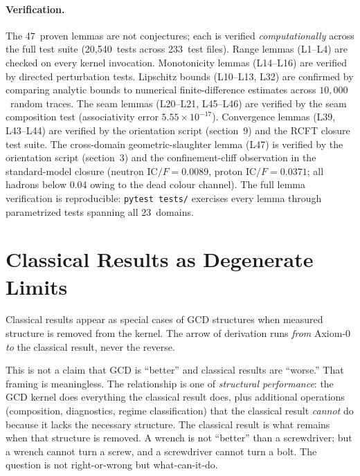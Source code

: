 \documentclass[
  aps,
  prd,
  twocolumn,
  superscriptaddress,
  nofootinbib,
  floatfix
]{revtex4-2}
\newcommand{\IC}{\mathrm{IC}}
\begin{document}
\paragraph{Verification.}
The 47~proven lemmas are not conjectures; each is verified
\emph{computationally} across the full test suite
(20{,}540~tests across 233~test files).  Range lemmas (L1--L4)
are checked on every kernel invocation.  Monotonicity lemmas
(L14--L16) are verified by directed perturbation tests.
Lipschitz bounds (L10--L13, L32) are confirmed by comparing
analytic bounds to numerical finite-difference estimates
across $10{,}000$~random traces.  The seam lemmas
(L20--L21, L45--L46) are verified by the seam composition
test (associativity error $5.55 \times 10^{-17}$).
Convergence lemmas (L39, L43--L44) are verified by the
orientation script (section~9) and the RCFT closure test
suite.  The cross-domain geometric-slaughter lemma (L47)
is verified by the orientation script (section~3) and the
confinement-cliff observation in the standard-model closure
(neutron $\IC/F = 0.0089$, proton $\IC/F = 0.0371$; all
hadrons below $0.04$ owing to the dead colour channel).
The full lemma verification is reproducible:
\texttt{pytest tests/} exercises every lemma through
parametrized tests spanning all 23~domains.


\section{Classical Results as Degenerate Limits}
\label{sec:degenerate}

Classical results appear as special cases of GCD structures when
measured structure is removed from the kernel.  The arrow of
derivation runs \emph{from} Axiom-0 \emph{to} the classical
result, never the reverse.

This is not a claim that GCD is ``better'' and classical
results are ``worse.''  That framing is meaningless.  The
relationship is one of \emph{structural performance}: the GCD
kernel does everything the classical result does, plus additional
operations (composition, diagnostics, regime classification)
that the classical result \emph{cannot} do because it lacks the
necessary structure.  The classical result is what remains when
that structure is removed.  A wrench is not ``better'' than a
screwdriver; but a wrench cannot turn a screw, and a screwdriver
cannot turn a bolt.  The question is not right-or-wrong but
what-can-it-do.
\end{document}
